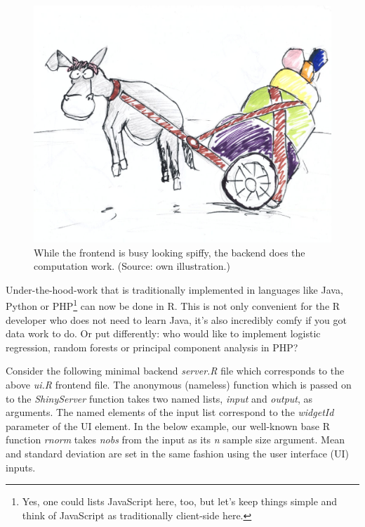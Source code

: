 \documentclass[
  12pt,
  letterpaper,
]{krantz}
\begin{document}
\begin{figure}

{\centering \includegraphics{./images/overload.jpg}

}

\caption{While the frontend is busy looking spiffy, the backend does the
computation work. (Source: own illustration.)}

\end{figure}

Under-the-hood-work that is traditionally implemented in languages like
Java, Python or PHP\footnote{Yes, one could
  lists JavaScript here, too, but let's keep things
  simple and think of JavaScript as traditionally
  client-side here.} can now be done in R. This is not only convenient
for the R developer who does not need to learn Java, it's also
incredibly comfy if you got data work to do. Or put differently: who
would like to implement logistic regression, random forests or principal
component analysis in PHP?

Consider the following minimal backend \emph{server.R} file which
corresponds to the above \emph{ui.R} frontend file. The anonymous
(nameless) function which is passed on to the \emph{ShinyServer}
function takes two named lists, \emph{input} and \emph{output}, as
arguments. The named elements of the input list correspond to the
\emph{widgetId} parameter of the UI element. In the below example, our
well-known base R function \emph{rnorm} takes \emph{nobs} from the input
as its \emph{n} sample size argument. Mean and standard deviation are
set in the same fashion using the user interface (UI) inputs.
\end{document}
